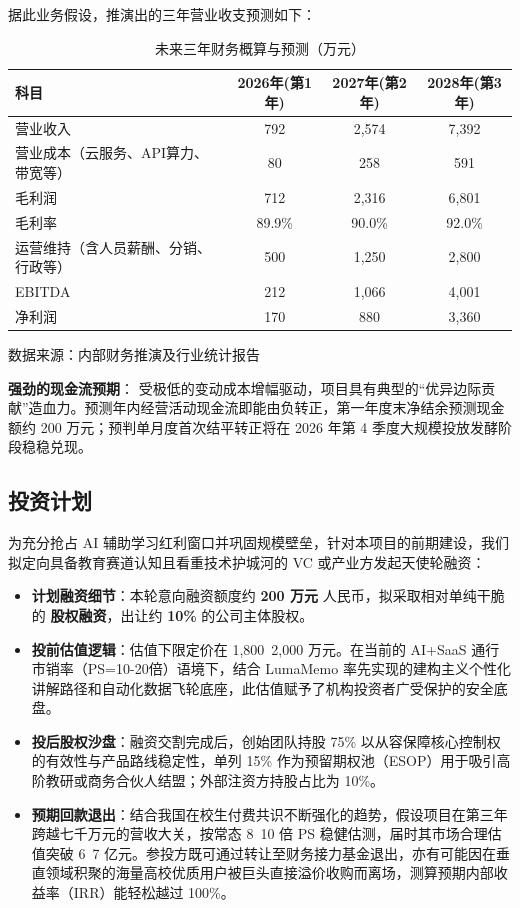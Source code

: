 据此业务假设，推演出的三年营业收支预测如下：
\begin{table}[htbp]
  \centering
  \small
  \caption{未来三年财务概算与预测（万元）}
  \begin{tabular}{p{}ccc}
    \toprule
    \textbf{科目} & \textbf{2026年(第1年)} & \textbf{2027年(第2年)} & \textbf{2028年(第3年)} \\
    \midrule
    营业收入 & 792 & 2,574 & 7,392 \\
    营业成本（云服务、API算力、带宽等） & 80 & 258 & 591 \\
    毛利润  & 712 & 2,316 & 6,801 \\
    毛利率  & 89.9\% & 90.0\% & 92.0\% \\
    运营维持（含人员薪酬、分销、行政等） & 500 & 1,250 & 2,800 \\
    EBITDA  & 212 & 1,066 & 4,001 \\
    净利润  & 170 & 880 & 3,360 \\
    \bottomrule
  \end{tabular}
  
  \vspace{0.1cm}
  \footnotesize{数据来源：内部财务推演及行业统计报告}
\end{table}

\textbf{强劲的现金流预期}：
受极低的变动成本增幅驱动，项目具有典型的“优异边际贡献”造血力。预测年内经营活动现金流即能由负转正，第一年度末净结余预测现金额约 200 万元；预判单月度首次结平转正将在 2026 年第 4 季度大规模投放发酵阶段稳稳兑现。

\subsection{投资计划}
为充分抢占 AI 辅助学习红利窗口并巩固规模壁垒，针对本项目的前期建设，我们拟定向具备教育赛道认知且看重技术护城河的 VC 或产业方发起天使轮融资：
\begin{itemize}
    \item \textbf{计划融资细节}：本轮意向融资额度约 \textbf{200 万元} 人民币，拟采取相对单纯干脆的 \textbf{股权融资}，出让约 \textbf{10\%} 的公司主体股权。
    \item \textbf{投前估值逻辑}：估值下限定价在 1,800~2,000 万元。在当前的 AI+SaaS 通行市销率（PS=10-20倍）语境下，结合 LumaMemo 率先实现的建构主义个性化讲解路径和自动化数据飞轮底座，此估值赋予了机构投资者广受保护的安全底盘。
    \item \textbf{投后股权沙盘}：融资交割完成后，创始团队持股 75\% 以从容保障核心控制权的有效性与产品路线稳定性，单列 15\% 作为预留期权池（ESOP）用于吸引高阶教研或商务合伙人结盟；外部注资方持股占比为 10\%。
    \item \textbf{预期回款退出}：结合我国在校生付费共识不断强化的趋势，假设项目在第三年跨越七千万元的营收大关，按常态 8~10 倍 PS 稳健估测，届时其市场合理估值突破 6~7 亿元。参投方既可通过转让至财务接力基金退出，亦有可能因在垂直领域积聚的海量高校优质用户被巨头直接溢价收购而离场，测算预期内部收益率（IRR）能轻松越过 100\%。
\end{itemize}

